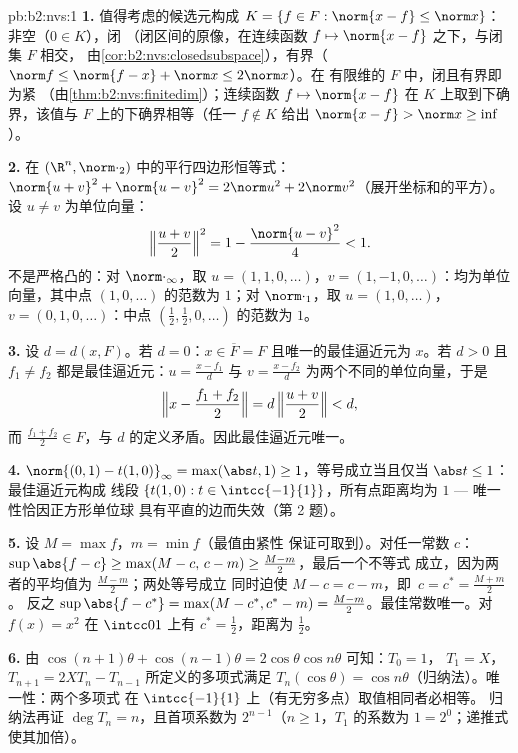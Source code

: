 \begin{solution}{pb:b2:nvs:1}
\textbf{1.} 值得考虑的候选元构成 $K = \{f \in F
: \norm{x - f} \leq \norm x\}$：非空（$0 \in K$），闭
（闭区间的原像，在连续函数 $f \mapsto
\norm{x - f}$ 之下，与闭集 $F$ 相交，
由\cref{cor:b2:nvs:closedsubspace}），有界（$\norm f \leq
\norm{f - x} + \norm x \leq 2\norm x$）。在
有限维的 $F$ 中，闭且有界即为紧
（由\cref{thm:b2:nvs:finitedim}）；连续函数 $f
\mapsto \norm{x - f}$ 在 $K$ 上取到下确界，该值与
$F$ 上的下确界相等（任一 $f \notin K$ 给出 $\norm{x -
f} > \norm x \geq \inf$）。

\textbf{2.} 在 $(\R^n,
\norm\cdot_2)$ 中的平行四边形恒等式：$\norm{u + v}^2 + \norm{u - v}^2 = 2\norm u^2 +
2\norm v^2$（展开坐标和的平方）。
设 $u \neq v$ 为单位向量：
\[
\Bigl\Vert\frac{u+v}2\Bigr\Vert^2 = 1 - \frac{\norm{u -
v}^2}{4} < 1 .
\]
不是严格凸的：对 $\norm\cdot_\infty$，取 $u = (1, 1, 0,
\dots)$，$v = (1, -1, 0, \dots)$：均为单位向量，其中点
$(1, 0, \dots)$ 的范数为 $1$；对 $\norm\cdot_1$，取 $u = (1,
0, \dots)$，$v = (0, 1, 0, \dots)$：中点 $(\frac12,
\frac12, 0, \dots)$ 的范数为 $1$。

\textbf{3.} 设 $d = d(x, F)$。若 $d = 0$：$x \in \overline F =
F$ 且唯一的最佳逼近元为 $x$。若 $d > 0$ 且 $f_1 \neq f_2$
都是最佳逼近元：$u = \frac{x - f_1}{d}$ 与 $v = \frac{x -
f_2}{d}$ 为两个不同的单位向量，于是
\[
\Bigl\Vert x - \frac{f_1 + f_2}2\Bigr\Vert
= d\,\Bigl\Vert\frac{u + v}2\Bigr\Vert < d ,
\]
而 $\frac{f_1 + f_2}2 \in F$，与
$d$ 的定义矛盾。因此最佳逼近元唯一。

\textbf{4.} $\norm{(0,1) - t(1,0)}_\infty = \max(\abs t, 1)
\geq 1$，等号成立当且仅当 $\abs t \leq 1$：最佳逼近元构成
线段 $\{t(1, 0) : t \in \intcc{-1}{1}\}$，所有点距离均为
$1$ --- 唯一性恰因正方形单位球
具有平直的边而失效（第 2 题）。

\textbf{5.} 设 $M = \max f$，$m = \min f$（最值由紧性
保证可取到）。对任一常数 $c$：$\sup\abs{f - c} \geq
\max(M - c,\, c - m) \geq \frac{M - m}2$，最后一个不等式
成立，因为两者的平均值为 $\frac{M-m}2$；两处等号成立
同时迫使 $M - c = c - m$，即\ $c = c^* = \frac{M + m}2$。
反之 $\sup\abs{f - c^*} = \max(M - c^*, c^* - m) =
\frac{M - m}2$。最佳常数唯一。对 $f(x) = x^2$ 在
$\intcc01$ 上有 $c^* = \frac12$，距离为 $\frac12$。

\textbf{6.} 由 $\cos(n{+}1)\theta + \cos(n{-}1)\theta =
2\cos\theta\cos n\theta$ 可知：$T_0 = 1$，
$T_1 = X$，$T_{n+1} = 2XT_n - T_{n-1}$ 所定义的多项式满足 $T_n(\cos\theta)
= \cos n\theta$（归纳法）。唯一性：两个多项式
在 $\intcc{-1}{1}$ 上（有无穷多点）取值相同者必相等。
归纳法再证 $\deg T_n = n$，且首项系数为
$2^{n-1}$（$n \geq 1$，$T_1$ 的系数为 $1 = 2^0$；递推式
使其加倍）。


\end{solution}
